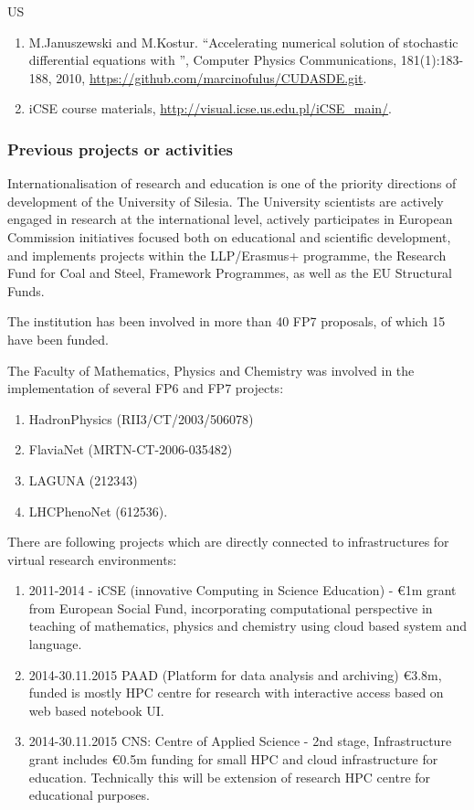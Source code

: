 \begin{sitedescription}{US}
\begin{enumerate}
\item  M.Januszewski and M.Kostur. ``Accelerating numerical solution of stochastic differential equations
with '',  Computer Physics Communications, 181(1):183-188, 2010,
\url{https://github.com/marcinofulus/CUDASDE.git}.

\item iCSE course materials, \url{http://visual.icse.us.edu.pl/iCSE\_main/}.

\end{enumerate}

\subsubsection*{Previous projects or activities}

Internationalisation of research and education is one of the priority
directions of development of the University of Silesia. The University
scientists are actively engaged in research at the international
level, actively participates in European Commission initiatives
focused both on educational and scientific development, and implements
projects within the LLP/Erasmus+ programme, the Research Fund for Coal
and Steel, Framework Programmes, as well as the EU Structural Funds.

The institution has been involved in more than 40 FP7 proposals, of
which 15 have been funded.

The Faculty of Mathematics, Physics and Chemistry was involved in the
implementation of several FP6 and FP7 projects:
\begin{enumerate}
\item HadronPhysics (RII3/CT/2003/506078)
\item FlaviaNet (MRTN-CT-2006-035482)
\item LAGUNA (212343)
\item LHCPhenoNet (612536). 
\end{enumerate}

There are following projects which are directly connected to
infrastructures for virtual research environments:

\begin{enumerate}
\item 2011-2014 - iCSE (innovative Computing in Science Education) -
  \euro 1m grant from European Social Fund, incorporating
  computational perspective in teaching of mathematics, physics and
  chemistry using cloud based \Sage system and \Python language.
\item 2014-30.11.2015 PAAD (Platform for data analysis and archiving) 
\euro 3.8m, funded is mostly HPC centre for research with
  interactive access based on web based notebook UI.
\item 2014-30.11.2015 CNS: Centre of Applied Science - 2nd stage,
  Infrastructure grant includes \euro 0.5m funding for small HPC and
  cloud infrastructure for education. Technically this will be
  extension of research HPC centre for educational purposes.
\end{enumerate}




\end{sitedescription}
